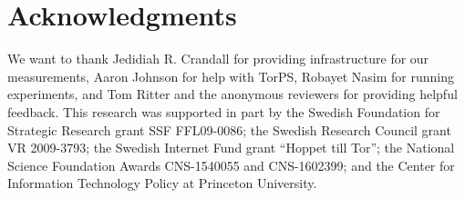\section*{Acknowledgments}
We want to thank Jedidiah R. Crandall for providing infrastructure for our
measurements, Aaron Johnson for help with TorPS, Robayet Nasim for running
\name experiments, and Tom Ritter and the anonymous reviewers for providing
helpful feedback.
%
This research was supported in part by the Swedish Foundation for Strategic
Research grant SSF FFL09-0086; the Swedish Research Council grant VR 2009-3793;
the Swedish Internet Fund grant ``Hoppet till Tor''; the National Science
Foundation Awards CNS-1540055 and CNS-1602399; and the Center for Information
Technology Policy at Princeton University.
